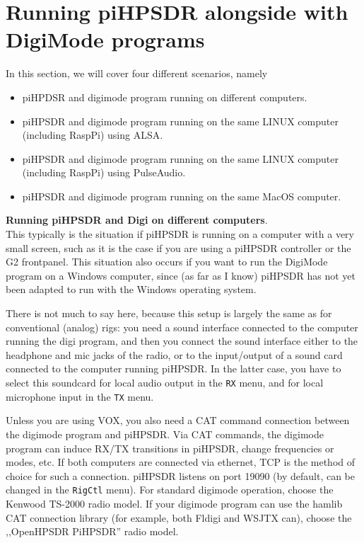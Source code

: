 \documentclass[12pt]{book}
\def\bltt#1{\texttt{\color{blue}#1}}
\begin{document}
\chapter[piHPSDR and digimode programs]{Running piHPSDR alongside with DigiMode programs}

In this section, we will cover four different scenarios, namely
\begin{itemize}
\item{piHPDSR and digimode program running on different computers.}
\item{piHPSDR and digimode program running on the same LINUX computer
(including RaspPi) using ALSA.}
\item{piHPSDR and digimode program running on the same LINUX computer
(including RaspPi) using PulseAudio.}
\item{piHPSDR and digimode program running on the same MacOS computer.}
\end{itemize}

\textbf{\color{red}Running piHPSDR and Digi on different computers}. \\
This typically is the situation if piHPSDR is running on a computer with a very small
screen, such as it is the case if you are using a piHPSDR controller or the G2 frontpanel.
This situation also occurs if you want to run the DigiMode program on a Windows computer,
since (as far as I know) piHPSDR has not yet been adapted to run with the Windows operating
system.

There is not much to say here, because this setup is largely the same as for conventional
(analog) rigs: you need a sound interface connected to the computer running the digi program,
and then you connect the sound interface either to the headphone and mic jacks of the radio,
or to the input/output of a sound card connected to the computer running piHPSDR. In the
latter case, you have to select this soundcard for local audio output in the \bltt{RX} menu,
and for local microphone input in the \bltt{TX} menu.

Unless you are using VOX, you also need a CAT command connection between the digimode program
and piHPSDR. Via CAT commands, the digimode program can induce RX/TX transitions in piHPSDR,
change frequencies or modes, etc. If both computers are connected via ethernet,
TCP is the method of choice for such a connection. piHPSDR listens on port 19090 (by default,
can be changed in the \bltt{RigCtl} menu). For standard digimode operation, choose the
Kenwood TS-2000 radio model. If your digimode program can use the hamlib CAT connection
library (for example, both Fldigi and WSJTX can), choose the ,,OpenHPSDR PiHPSDR'' radio
model.
\end{document}
